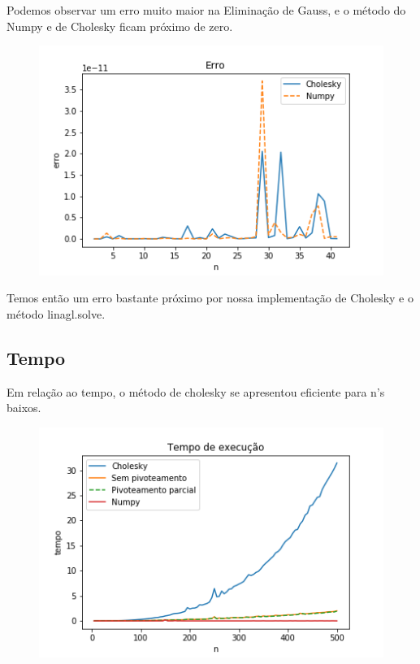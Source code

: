 \documentclass{article}
\begin{document}
\hfill

Podemos observar um erro muito maior na Eliminação de Gauss, e o método do Numpy e de Cholesky ficam próximo de zero.


\begin{figure}[ht]
    \centering
    \includegraphics[scale=0.5]{erro_cholesky3.png}
    \label{fig:my_label}
\end{figure}

\par Temos então um erro bastante próximo por nossa implementação de Cholesky e o método linagl.solve.

\subsection{Tempo}
Em relação ao tempo, o método de cholesky se apresentou eficiente para n's baixos.

\begin{figure}[ht]
    \centering
    \includegraphics[scale=0.5]{tempo2.png}
    \label{fig:my_label}
\end{figure}
\end{document}
